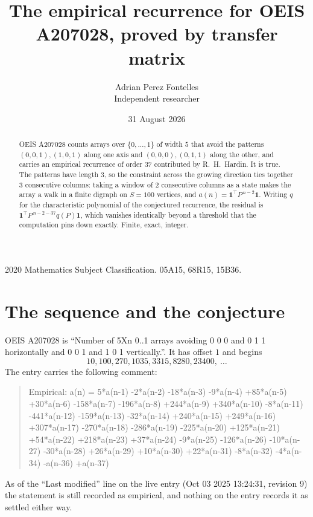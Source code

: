 \documentclass[11pt,a4paper]{article}
\title{The empirical recurrence for OEIS A207028, proved by transfer matrix}
\author{Adrian Perez Fontelles\\ \small Independent researcher}
\date{31 August 2026}
\theoremstyle{plain}
\theoremstyle{definition}
\begin{document}
\maketitle

\begin{abstract}
OEIS A207028 counts arrays over $\{0,\dots,1\}$ of width $5$ that avoid the patterns
$(0,0,1), (1,0,1)$ along one axis and $(0,0,0), (0,1,1)$ along the other, and carries an empirical recurrence of
order $37$ contributed by R.~H.~Hardin. It is true. The patterns have length $3$, so
the constraint across the growing direction ties together $3$ consecutive columns: taking a
window of $2$ consecutive columns as a state makes the array a walk in a finite digraph
on $S=100$ vertices, and $a(n)=\mathbf{1}^{\!\top}P^{\,n-2}\mathbf{1}$. Writing $q$
for the characteristic polynomial of the conjectured recurrence, the residual is
$\mathbf{1}^{\!\top}P^{\,n-2-37}q(P)\mathbf{1}$, which vanishes identically
beyond a threshold that the computation pins down exactly. Finite, exact, integer.
\end{abstract}

\noindent\small 2020 Mathematics Subject Classification. 05A15, 68R15, 15B36.\normalsize

\section{The sequence and the conjecture}

OEIS A207028 is ``Number of 5Xn 0..1 arrays avoiding 0 0 0 and 0 1 1 horizontally and 0 0 1 and 1 0 1 vertically.''. It has offset
$1$ and begins
\[
10, 100, 270, 1035, 3315, 8280, 23400,\ \dots
\]
The entry carries the following comment:
\begin{quote}\small
Empirical: a(n) = 5*a(n-1) -2*a(n-2) -18*a(n-3) -9*a(n-4) +85*a(n-5) +30*a(n-6) -158*a(n-7) -196*a(n-8) +244*a(n-9) +340*a(n-10) -8*a(n-11) -441*a(n-12) -159*a(n-13) -32*a(n-14) +240*a(n-15) +249*a(n-16) +307*a(n-17) -270*a(n-18) -286*a(n-19) -225*a(n-20) +125*a(n-21) +54*a(n-22) +218*a(n-23) +37*a(n-24) -9*a(n-25) -126*a(n-26) -10*a(n-27) -30*a(n-28) +26*a(n-29) +10*a(n-30) +22*a(n-31) -8*a(n-32) -4*a(n-34) -a(n-36) +a(n-37)
\end{quote}
As of the ``Last modified'' line on the live entry (Oct 03 2025 13:24:31, revision
9) the statement is still recorded as empirical, and nothing on the entry
records it as settled either way.
\end{document}
